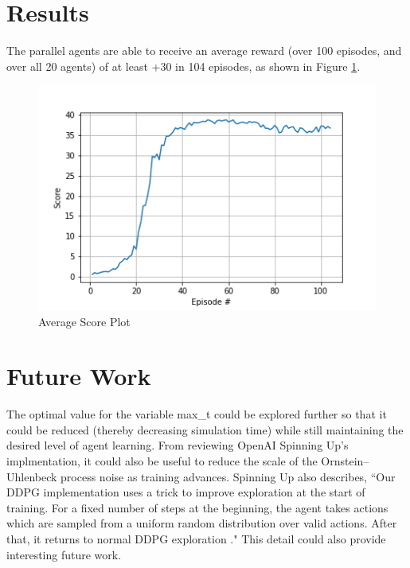 \documentclass{article}
\begin{document}
\section{Results}
The parallel agents are able to receive an average reward (over 100 episodes, and over all 20 agents) of at least +30 in 104 episodes, as shown in Figure \ref{fig:results}.

\begin{figure}[ht]
\centering
\includegraphics[scale=0.75]{./figures/results.png}
\caption{Average Score Plot}
\label{fig:results}
\end{figure}

\section{Future Work}
The optimal value for the variable max\_t could be explored further so that it could be reduced (thereby decreasing simulation time) while still maintaining the desired level of agent learning. From reviewing \enspace  OpenAI Spinning Up's implmentation, it could also be useful to reduce the scale of the Ornstein–Uhlenbeck process noise as training advances. Spinning Up also describes, ``Our DDPG implementation uses a trick to improve exploration at the start of training. For a fixed number of steps at the beginning, the agent takes actions which are sampled from a uniform random distribution over valid actions. After that, it returns to normal DDPG exploration \cite{SpinningUp2018} ." This detail could also provide interesting future work. 



\end{document}
